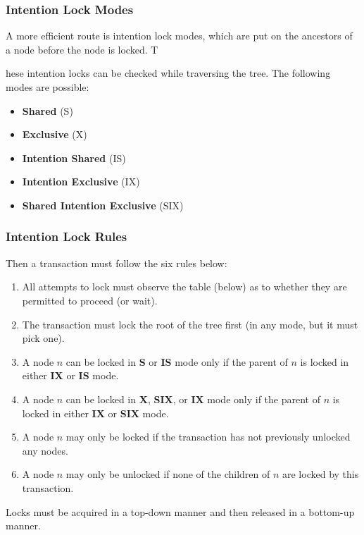 \begin{frame}
\frametitle{Intention Lock Modes}

A more efficient route is \alert{intention lock modes}, which are put on the ancestors of a node before the node is locked. T

hese intention locks can be checked while traversing the tree. The following modes are possible:

\begin{itemize}
	\item \textbf{Shared} (S)
	\item \textbf{Exclusive} (X) 
	\item \textbf{Intention Shared} (IS) 
	\item \textbf{Intention Exclusive} (IX) 
	\item \textbf{Shared Intention Exclusive} (SIX)
\end{itemize} 


\end{frame}

\begin{frame}
\frametitle{Intention Lock Rules}

Then a transaction must follow the six rules below:

\begin{enumerate}
	\item All attempts to lock must observe the table (below) as to whether they are permitted to proceed (or wait).
	\item The transaction must lock the root of the tree first (in any mode, but it must pick one).
	\item A node $n$ can be locked in \textbf{S} or \textbf{IS} mode only if the parent of $n$ is locked in either \textbf{IX} or \textbf{IS} mode.
	\item A node $n$ can be locked in \textbf{X}, \textbf{SIX}, or \textbf{IX} mode only if the parent of $n$ is locked in either \textbf{IX} or \textbf{SIX} mode.
	\item A node $n$ may only be locked if the transaction has not previously unlocked any nodes.
	\item A node $n$ may only be unlocked if none of the children of $n$ are locked by this transaction.
\end{enumerate}

Locks must be acquired in a top-down manner and then released in a bottom-up manner. 

\end{frame}

